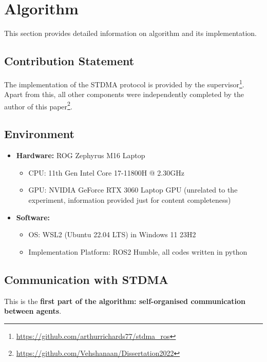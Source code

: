 \chapter{Algorithm}
\label{chap:Algorithm}

This section provides detailed information on algorithm and its implementation.

\section*{Contribution Statement}

The implementation of the STDMA protocol is provided by the supervisor\footnote{\url{https://github.com/arthurrichards77/stdma_ros}}. Apart from this, all other components were independently completed by the author of this paper\footnote{\url{https://github.com/Vehshanaan/Dissertation2022}}.

\section*{Environment}

\begin{itemize}
    \item \textbf{Hardware:} ROG Zephyrus M16 Laptop
    \begin{itemize}
        \item CPU: 11th Gen Intel Core 17-11800H @ 2.30GHz
        \item GPU: NVIDIA GeForce RTX 3060 Laptop GPU (unrelated to the experiment, information provided just for content completeness)
    \end{itemize}
    \item \textbf{Software:}
    \begin{itemize}
        \item OS: WSL2 (Ubuntu 22.04 LTS) in Windows 11 23H2
        \item Implementation Platform: ROS2 Humble, all codes written in python
    \end{itemize}
\end{itemize}

\section{Communication with STDMA}

This is the \textbf{first part of the algorithm: self-organised communication between agents}.

